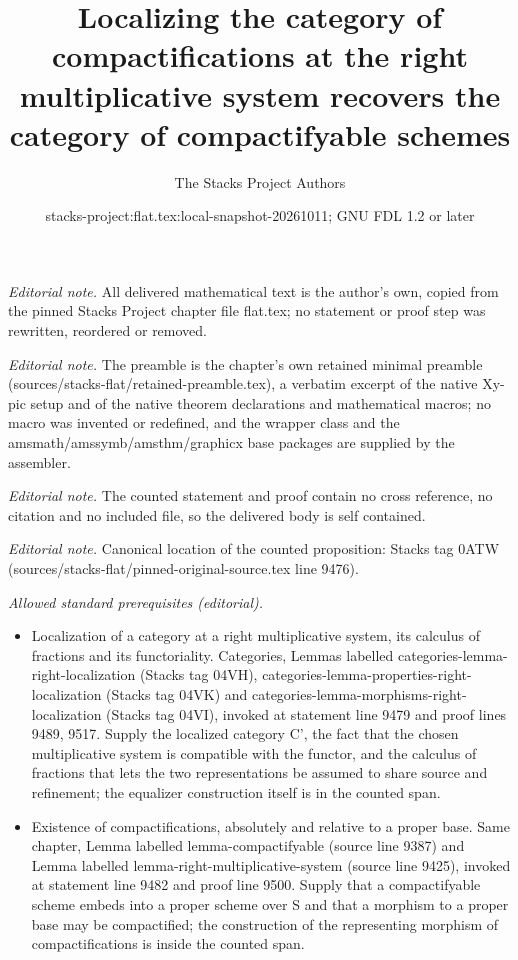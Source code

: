\documentclass[10pt,a4paper]{amsart}
\title{Localizing the category of compactifications at the right multiplicative system recovers the category of compactifyable schemes}
\author{The Stacks Project Authors}
\date{stacks-project:flat.tex:local-snapshot-20261011; GNU FDL 1.2 or later}
\theoremstyle{plain}
\theoremstyle{definition}
\theoremstyle{remark}
\numberwithin{equation}{subsection}
\begin{document}
\maketitle
\noindent\textit{Editorial note.} All delivered mathematical text is the author's own, copied from the pinned Stacks Project chapter file flat.tex; no statement or proof step was rewritten, reordered or removed.\par\medskip
\noindent\textit{Editorial note.} The preamble is the chapter's own retained minimal preamble (sources/stacks-flat/retained-preamble.tex), a verbatim excerpt of the native Xy-pic setup and of the native theorem declarations and mathematical macros; no macro was invented or redefined, and the wrapper class and the amsmath/amssymb/amsthm/graphicx base packages are supplied by the assembler.\par\medskip
\noindent\textit{Editorial note.} The counted statement and proof contain no cross reference, no citation and no included file, so the delivered body is self contained.\par\medskip
\noindent\textit{Editorial note.} Canonical location of the counted proposition: Stacks tag 0ATW (sources/stacks-flat/pinned-original-source.tex line 9476).\par\medskip
\noindent\textit{Allowed standard prerequisites (editorial).}\begin{itemize}
\item Localization of a category at a right multiplicative system, its calculus of fractions and its functoriality. Categories, Lemmas labelled categories-lemma-right-localization (Stacks tag 04VH), categories-lemma-properties-right-localization (Stacks tag 04VK) and categories-lemma-morphisms-right-localization (Stacks tag 04VI), invoked at statement line 9479 and proof lines 9489, 9517. Supply the localized category C', the fact that the chosen multiplicative system is compatible with the functor, and the calculus of fractions that lets the two representations be assumed to share source and refinement; the equalizer construction itself is in the counted span.
\item Existence of compactifications, absolutely and relative to a proper base. Same chapter, Lemma labelled lemma-compactifyable (source line 9387) and Lemma labelled lemma-right-multiplicative-system (source line 9425), invoked at statement line 9482 and proof line 9500. Supply that a compactifyable scheme embeds into a proper scheme over S and that a morphism to a proper base may be compactified; the construction of the representing morphism of compactifications is inside the counted span.
\end{itemize}\medskip
\end{document}
